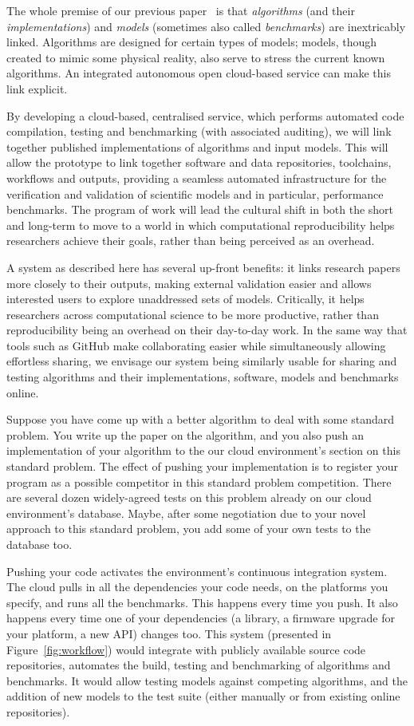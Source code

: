 \documentclass[a4paper,11pt]{article}
\begin{document}
The whole premise of our previous paper~\cite{crick-et-al_recomp2014}
is that {\emph{algorithms}} (and their {\emph{implementations}}) and
{\emph{models}} (sometimes also called {\emph{benchmarks}}) are
inextricably linked. Algorithms are designed for certain types of
models; models, though created to mimic some physical reality, also
serve to stress the current known algorithms. An integrated autonomous
open cloud-based service can make this link explicit.

By developing a cloud-based, centralised service, which performs
automated code compilation, testing and benchmarking (with associated
auditing), we will link together published implementations of
algorithms and input models. This will allow the prototype to link
together software and data repositories, toolchains, workflows and
outputs, providing a seamless automated infrastructure for the
verification and validation of scientific models and in particular,
performance benchmarks. The program of work will lead the cultural
shift in both the short and long-term to move to a world in which
computational reproducibility helps researchers achieve their goals,
rather than being perceived as an overhead.

A system as described here has several up-front benefits: it links
research papers more closely to their outputs, making external
validation easier and allows interested users to explore unaddressed
sets of models. Critically, it helps researchers across computational
science to be more productive, rather than reproducibility being an
overhead on their day-to-day work. In the same way that tools such as
GitHub make collaborating easier while simultaneously allowing
effortless sharing, we envisage our system being similarly usable for
sharing and testing algorithms and their implementations, software,
models and benchmarks online.

Suppose you have come up with a better algorithm to deal with some
standard problem.  You write up the paper on the algorithm, and you
also push an implementation of your algorithm to the our cloud
environment's section on this standard problem. The effect of pushing
your implementation is to register your program as a possible
competitor in this standard problem competition. There are several
dozen widely-agreed tests on this problem already on our cloud
environment's database. Maybe, after some negotiation due to your
novel approach to this standard problem, you add some of your own
tests to the database too.

Pushing your code activates the environment's continuous integration
system.  The cloud pulls in all the dependencies your code needs, on
the platforms you specify, and runs all the benchmarks. This happens
every time you push. It also happens every time one of your
dependencies (a library, a firmware upgrade for your platform, a new
API) changes too. This system (presented in Figure~\ref{fig:workflow})
would integrate with publicly available source code repositories,
automates the build, testing and benchmarking of algorithms and
benchmarks. It would allow testing models against competing
algorithms, and the addition of new models to the test suite (either
manually or from existing online repositories).
\end{document}
